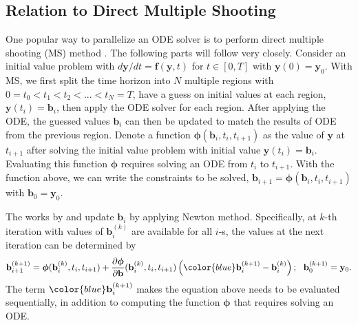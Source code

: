 \subsection{Relation to Direct Multiple Shooting}
\label{appsubsec:relation-to-direct-multiple-shooting}

One popular way to parallelize an ODE solver is to perform direct multiple shooting (MS) method \citep{chartier1993parallel, massaroli2021differentiablemultipleshooting}.
The following parts will follow \cite{massaroli2021differentiablemultipleshooting} very closely.
Consider an initial value problem with $d\mathbf{y}/dt = \mathbf{f}(\mathbf{y}, t)$ for $t \in [0, T]$ with $\mathbf{y}(0) = \mathbf{y}_0$.
With MS, we first split the time horizon into $N$ multiple regions with $0 = t_0 < t_1 < t_2 < ... < t_N = T$, have a guess on initial values at each region, $\mathbf{y}(t_i) = \mathbf{b}_i$, then apply the ODE solver for each region.
After applying the ODE, the guessed values $\mathbf{b}_i$ can then be updated to match the results of ODE from the previous region.
Denote a function $\boldsymbol{\phi}(\mathbf{b}_i, t_i, t_{i+1})$ as the value of $\mathbf{y}$ at $t_{i+1}$ after solving the initial value problem with initial value $\mathbf{y}(t_i) = \mathbf{b}_i$.
Evaluating this function $\boldsymbol{\phi}$ requires solving an ODE from $t_i$ to $t_{i+1}$.
With the function above, we can write the constraints to be solved, $\mathbf{b}_{i+1} = \boldsymbol{\phi}(\mathbf{b}_i, t_i, t_{i+1})$ with $\mathbf{b}_0 = \mathbf{y}_0$.

The works by \cite{chartier1993parallel} and \cite{massaroli2021differentiablemultipleshooting} update $\mathbf{b}_i$ by applying Newton method.
Specifically, at $k$-th iteration with values of $\mathbf{b}_i^{(k)}$ are available for all $i$-s, the values at the next iteration can be determined by \citep{massaroli2021differentiablemultipleshooting}
\begin{align}
\label{appeq:newton-update-multi-shooting}
    \mathbf{b}_{i+1}^{(k+1)} = \boldsymbol{\phi}(\mathbf{b}_i^{(k)}, t_i, t_{i+1}) + \frac{\partial \boldsymbol{\phi}}{\partial \mathbf{b}}(\mathbf{b}_i^{(k)}, t_i, t_{i+1}) \left({\color{blue}\mathbf{b}_i^{(k+1)}} - \mathbf{b}_i^{(k)}\right);\ \ \mathbf{b}_0^{(k+1)} = \mathbf{y}_0.
\end{align}
The term ${\color{blue}\mathbf{b}_i^{(k+1)}}$ makes the equation above needs to be evaluated sequentially, in addition to computing the function $\boldsymbol{\phi}$ that requires solving an ODE.

